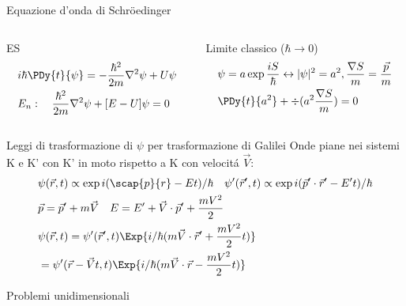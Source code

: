 \begin{frame}{Equazione d'onda di Schr\"oedinger}

\begin{columns}[T]
\begin{column}{0.5\textwidth}
\begin{block}{ES}
\begin{align*}
    &i\hbar\PDy{t}{\psi}=-\frac{\hbar^2}{2m}\nabla^2\psi+U\psi\\
    &E_n:\quad \frac{\hbar^2}{2m}\nabla^2\psi+[E-U]\psi=0
\end{align*}
\end{block}

\end{column}
\begin{column}{0.5\textwidth}
\begin{block}{Limite classico ($\hbar\to0$)}
\begin{align*}
    &\psi=a\exp{\frac{iS}{\hbar}} \leftrightarrow |\psi|^2=a^2,\frac{\nabla S}{m}=\frac{\vec{p}}{m}\\
    &\PDy{t}{a^2}+\div{(a^2\frac{\nabla S}{m})}=0
\end{align*}
\end{block}
\end{column}

\end{columns}

\begin{block}{Leggi di trasformazione di $\psi$ per trasformazione di Galilei}
Onde piane nei sistemi K e K' con K' in moto rispetto a K con velocit\'a $\vec{V}$:
\begin{align*}
    &\psi(\vec{r},t)\propto\exp{i(\scap{p}{r}-Et)/\hbar}\quad \psi'(\vec{r}',t)\propto\exp{i(\vec{p}'\cdot\vec{r}'-E't)/\hbar}\\
    &\vec{p}=\vec{p}'+m\vec{V}\quad E=E'+\vec{V}\cdot\vec{p}'+\frac{mV^2}{2}\\
    &\psi(\vec{r},t)=\psi'(\vec{r}',t)\Exp{i/\hbar(m\vec{V}\cdot\vec{r}'+\frac{mV^2}{2}t)}\\
    &=\psi'(\vec{r}-\vec{V}t,t)\Exp{i/\hbar(m\vec{V}\cdot\vec{r}-\frac{mV^2}{2}t)}
\end{align*}
\end{block}

\end{frame}

\begin{frame}{Problemi unidimensionali}
    
\end{frame}

